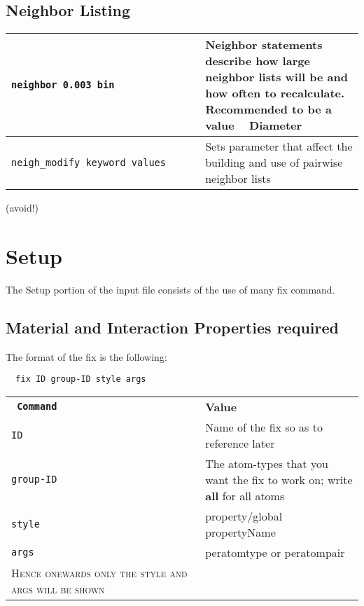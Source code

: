 \documentclass[8pt]{extarticle} %
\begin{document}
\begin{multicols}{3}
  \vspace*{1ex}
  \subsection{Neighbor Listing}
  \begin{tabular}{L{0.55\linewidth} L{0.45\linewidth}}
    \tt neighbor 0.003 bin                  & Neighbor statements describe how large neighbor lists will be and how often to recalculate. Recommended to be a value ~ Diameter \\
    \hline
  \tt neigh\_modify keyword values & Sets parameter that affect the building and use of pairwise neighbor lists \\
  \end{tabular}
  \vspace*{-10pt}\hspace{2cm} (avoid!)


  \section{Setup}
  The Setup portion of the input file consists of the use of many fix command.

\subsection{Material and Interaction Properties required}
The format of the fix is the following:
\begin{verbatim}
  fix ID group-ID style args
  \end{verbatim}
  \begin{tabular}{L{0.55\linewidth} L{0.45\linewidth}}
    \tt\textbf{ Command} &  \textbf{Value} \\
    \tt ID             & Name of the fix so as to reference later                \\
    \hline
    \tt group-ID     & The atom-types that you want the fix to work on; write \textbf{all} for all atoms          \\
    \hline
    \tt style  & property/global propertyName \\
    \hline
    \tt args & peratomtype or peratompair \\
    \vspace*{1ex}
      \vspace*{1ex}

    \textsc{Hence onewards only the style and args will be shown}

  \end{tabular}
  \vspace*{1ex}


\end{multicols}
\end{document}
